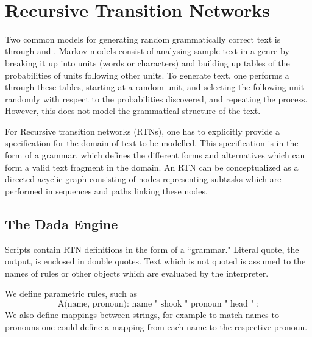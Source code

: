 \documentclass[12pt, a4paper, oneside, openright, titlepage]{book}
\begin{document}
\begin{appendices}
    \
        \section{Recursive Transition Networks}

        Two common models for generating random grammatically correct text is through  and . Markov models consist of analysing sample text in a genre by breaking it up into units (words or characters) and building up tables of the probabilities of units following other units. To generate text. one performs a  through these tables, starting at a random unit, and selecting the following unit randomly with respect to the probabilities discovered, and repeating the process. However, this does not model the grammatical structure of the text. 

        For Recursive transition networks (RTNs), one has to explicitly provide a specification for the domain of text to be modelled. This specification is in the form of a grammar, which defines the different forms and alternatives which can form a valid text fragment in the domain. An RTN can be conceptualized as a directed acyclic graph consisting of nodes representing subtasks which are performed in sequences and paths linking these nodes.

        \subsection{The Dada Engine}

        Scripts contain RTN definitions in the form of a ``grammar." Literal quote, the output, is enclosed in double quotes. Text which is not quoted is assumed to the names of rules or other objects which are evaluated by the interpreter.

        We define parametric rules, such as $$\text{A(name, pronoun): name " shook " pronoun " head " ;}$$ We also define mappings between strings, for example to match names to pronouns one could define a mapping from each name to the respective pronoun. 
\end{appendices}
\end{document}
